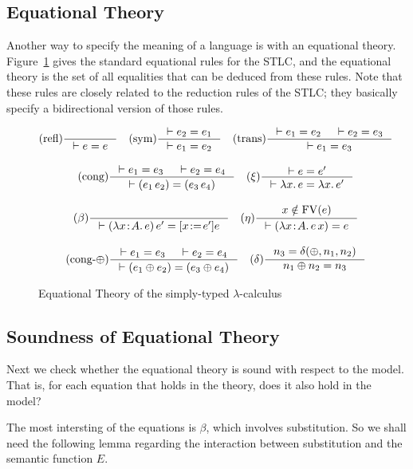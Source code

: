 \documentclass{tufte-handout}
\newcommand{\LAM}[1]{\lambda #1.\,}
\newcommand{\APP}[0]{\,}
\newcommand{\of}[0]{\!:\!}
\newcommand{\by}[0]{\!:=\!}
\begin{document}
\subsection{Equational Theory}

Another way to specify the meaning of a language is with an equational
theory. Figure~\ref{fig:stlc-eqns} gives the standard equational rules
for the STLC, and the equational theory is the set of all equalities
that can be deduced from these rules.  Note that these rules are
closely related to the reduction rules of the STLC; they basically
specify a bidirectional version of those rules.

\begin{figure}[tbp]
\begin{gather*}
  \text{(refl)}
  \inference{}{\vdash e = e}
  \quad
  \text{(sym)}
  \inference{\vdash e_2 = e_1}{\vdash e_1 = e_2}
  \quad
  \text{(trans)}
  \inference{\vdash e_1 = e_2 & \vdash e_2 = e_3}{\vdash e_1 = e_3}  
  \\[2ex]
  \text{(cong)}
  \inference{\vdash e_1 = e_3 & \vdash e_2 = e_4}
    {\vdash (e_1\APP e_2) = (e_3 \APP e_4)}
  \quad
  (\xi)\inference{\vdash e = e'}{\vdash \LAM{x}e = \LAM{x}e'}
  \\[2ex]
  (\beta) \inference{}{\vdash (\LAM{x\of A}e)\APP e' = [x\by e']e}
  \quad
  (\eta) \inference{x \notin \mathrm{FV}(e)}
      {\vdash (\LAM{x\of A} e \APP x) = e}
  \\[2ex]
  \text{(cong-$\oplus$)}
  \inference{\vdash e_1 = e_3 & \vdash e_2 = e_4}
    {\vdash (e_1\oplus e_2) = (e_3 \oplus e_4)}
  \quad
  \text{($\delta$)}\inference{n_3 = \delta(\oplus,n_1,n_2)}{n_1\oplus n_2 = n_3}
\end{gather*}
\caption{Equational Theory of the simply-typed $\lambda$-calculus}
\label{fig:stlc-eqns}
\end{figure}


\subsection{Soundness of Equational Theory}

Next we check whether the equational theory is sound with respect to
the model. That is, for each equation that holds in the theory, does
it also hold in the model?

The most intersting of the equations is $\beta$, which involves
substitution. So we shall need the following lemma regarding the
interaction between substitution and the semantic function $E$.
\end{document}
